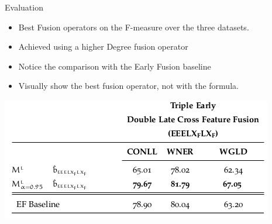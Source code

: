 \documentclass[10pt,xcolor=table]{beamer}
\newcommand\mlex{M^{\scriptscriptstyle L}}
\newcommand\mstd{M^{\scriptscriptstyle T}}
\newcommand\slex{S^{\scriptscriptstyle L}}
\newcommand\ssyn{S^{\scriptscriptstyle S}}
\newcommand\sstd{S^{\scriptscriptstyle T}}
\begin{document}
%


\begin{frame}[t]{Evaluation}

\begin{itemize}
\item Best Fusion operators on the F-measure over the three datasets.  
\item Achieved using a higher Degree fusion operator
\item Notice the comparison with the Early Fusion baseline
\item Visually show the best fusion operator, not with the formula.
\end{itemize}
\textbf{}

\begin{center}
\includegraphics[width=0.6\linewidth]{image2/Chapitre4/hf_trim.png}
\end{center}


\vspace{\textheight}
\end{frame}
\end{document}
